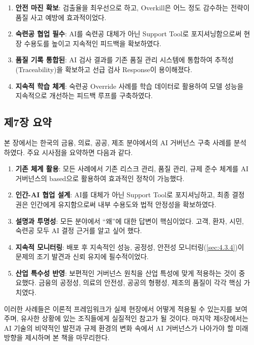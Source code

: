 \begin{enumerate}
 \item \textbf{안전 마진 확보}: 
 검출율을 최우선으로 하고, Overkill은 어느 정도 감수하는 전략이 
 품질 사고 예방에 효과적이었다.
 
 \item \textbf{숙련공 협업 필수}: 
 AI를 숙련공 대체가 아닌 Support Tool로 포지셔닝함으로써 
 현장 수용도를 높이고 지속적인 피드백을 확보하였다.
 
 \item \textbf{품질 기록 통합된}: 
 AI 검사 결과를 기존 품질 관리 시스템에 통합하여 
 추적성(Traceability)을 확보하고 선급 검사 Response이 용이해졌다.
 
 \item \textbf{지속적 학습 체계}: 
 숙련공 Override 사례를 학습 데이터로 활용하여 
 모델 성능을 지속적으로 개선하는 피드백 루프를 구축하였다.
\end{enumerate}


\subsection*{제7장 요약}

본 장에서는 한국의 금융, 의료, 공공, 제조 분야에서의 
AI 거버넌스 구축 사례를 분석하였다. 주요 시사점을 요약하면 다음과 같다.

\begin{enumerate}
 \item \textbf{기존 체계 활용}: 
 모든 사례에서 기존 리스크 관리, 품질 관리, 규제 준수 체계를 
 AI 거버넌스의 based으로 활용하여 효과적인 정착이 가능했다.
 
 \item \textbf{인간-AI 협업 설계}: 
 AI를 대체가 아닌 Support Tool로 포지셔닝하고, 
 최종 결정권은 인간에게 유지함으로써 
 내부 수용도와 법적 안정성을 확보하였다.
 
 \item \textbf{설명과 투명성}: 
 모든 분야에서 ``왜''에 대한 답변이 핵심이었다. 
 고객, 환자, 시민, 숙련공 모두 AI 결정 근거를 알고 싶어 했다.
 
 \item \textbf{지속적 모니터링}: 
 배포 후 지속적인 성능, 공정성, 안전성 모니터링(\ref{sec:4.3.4})이 
 문제의 조기 발견과 신뢰 유지에 필수적이었다.
 
 \item \textbf{산업 특수성 반영}: 
 보편적인 거버넌스 원칙을 산업 특성에 맞게 적용하는 것이 중요했다. 
 금융의 공정성, 의료의 안전성, 공공의 형평성, 제조의 품질이 
 각각 핵심 가치였다.
\end{enumerate}

이러한 사례들은 이론적 프레임워크가 실제 현장에서 
어떻게 적용될 수 있는지를 보여주며, 
유사한 상황에 있는 조직들에게 실질적인 참고가 될 것이다. 
마지막 제8장에서는 AI 기술의 비약적인 발전과 규제 환경의 변화 속에서 
AI 거버넌스가 나아가야 할 미래 방향을 제시하며 본 책을 마무리한다.
